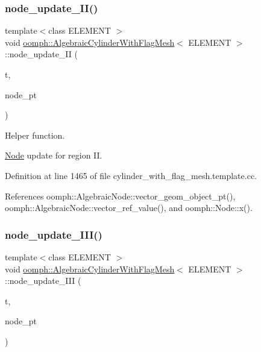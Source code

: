 \subsubsection{\texorpdfstring{node\+\_\+update\+\_\+\+I\+I()}{node\_update\_II()}}
{\footnotesize\ttfamily template$<$class E\+L\+E\+M\+E\+NT $>$ \\
void \hyperlink{classoomph_1_1AlgebraicCylinderWithFlagMesh}{oomph\+::\+Algebraic\+Cylinder\+With\+Flag\+Mesh}$<$ E\+L\+E\+M\+E\+NT $>$\+::node\+\_\+update\+\_\+\+II (\begin{DoxyParamCaption}\item[{const unsigned \&}]{t,  }\item[{\hyperlink{classoomph_1_1AlgebraicNode}{Algebraic\+Node} $\ast$\&}]{node\+\_\+pt }\end{DoxyParamCaption})\hspace{0.3cm}{\ttfamily [protected]}}



Helper function. 

\hyperlink{classoomph_1_1Node}{Node} update for region II. 

Definition at line 1465 of file cylinder\+\_\+with\+\_\+flag\+\_\+mesh.\+template.\+cc.



References oomph\+::\+Algebraic\+Node\+::vector\+\_\+geom\+\_\+object\+\_\+pt(), oomph\+::\+Algebraic\+Node\+::vector\+\_\+ref\+\_\+value(), and oomph\+::\+Node\+::x().

\mbox{\label{classoomph_1_1AlgebraicCylinderWithFlagMesh_a3e8c71cc3ab123864b4f999e612345ee}} 
\subsubsection{\texorpdfstring{node\+\_\+update\+\_\+\+I\+I\+I()}{node\_update\_III()}}
{\footnotesize\ttfamily template$<$class E\+L\+E\+M\+E\+NT $>$ \\
void \hyperlink{classoomph_1_1AlgebraicCylinderWithFlagMesh}{oomph\+::\+Algebraic\+Cylinder\+With\+Flag\+Mesh}$<$ E\+L\+E\+M\+E\+NT $>$\+::node\+\_\+update\+\_\+\+I\+II (\begin{DoxyParamCaption}\item[{const unsigned \&}]{t,  }\item[{\hyperlink{classoomph_1_1AlgebraicNode}{Algebraic\+Node} $\ast$\&}]{node\+\_\+pt }\end{DoxyParamCaption})\hspace{0.3cm}{\ttfamily [protected]}}



